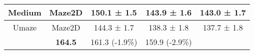 \begin{table}[h]
{\begin{tabular}{cc|ccc}
    \cellcolor[HTML]{FFFFFF}Medium        & \cellcolor[HTML]{FFFFFF}Maze2D         & 150.1 ± 1.5                         & \cellcolor[HTML]{FFFFFF}143.9 ± 1.6 & 143.0 ± 1.7      \\ \hline
    \cellcolor[HTML]{FFFFFF}Umaze         & \cellcolor[HTML]{FFFFFF}Maze2D         & 144.3 ± 1.7                         & \cellcolor[HTML]{FFFFFF}138.3 ± 1.8 & 137.7 ± 1.8      \\ \hline
    \rowcolor[HTML]{E7E6E6} 
    \multicolumn{2}{c|}{\cellcolor[HTML]{E7E6E6}\textbf{Performance}}              & \textbf{164.5}                      & 161.3 (-1.9\%)                              & 159.9 (-2.9\%)           \\ \hline
\end{tabular}
}
\end{table}
